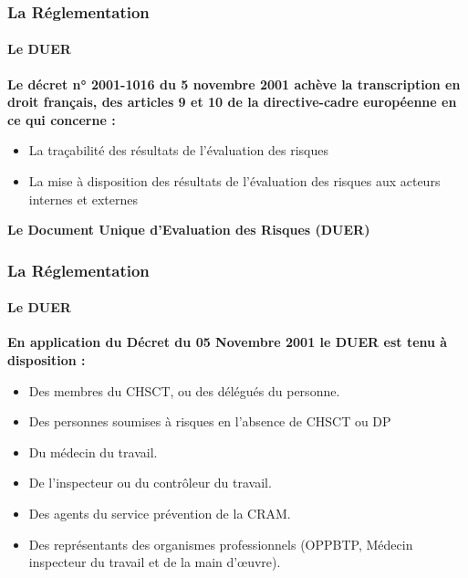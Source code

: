 \documentclass{beamer}
\begin{document}
\begin{frame}
\frametitle{La Réglementation}
\framesubtitle{Le DUER}

\textbf{Le décret n° 2001-1016  du 5 novembre 2001 achève la transcription en droit français, des articles 9 et 10 de 
la directive-cadre européenne en ce qui concerne :}

\begin{itemize}
    \item La traçabilité des résultats de l’évaluation des risques
	\item La mise à disposition des résultats de l’évaluation des risques aux acteurs internes et externes
\end{itemize}

\textbf{Le Document Unique d’Evaluation des Risques (DUER)}
\end{frame}



\begin{frame}
\frametitle{La Réglementation}
\framesubtitle{Le DUER}

\textbf{En application du Décret du 05 Novembre 2001 le DUER est tenu à disposition :}
\begin{itemize}
    \item Des membres du CHSCT, ou des délégués du personne.
	\item Des personnes soumises à risques en l’absence de CHSCT ou DP
	\item Du médecin du travail.
	\item De l’inspecteur ou du contrôleur du travail.
	\item Des agents du service prévention de la CRAM.
	\item Des représentants des organismes professionnels (OPPBTP, Médecin inspecteur du travail et de la main d’œuvre).
\end{itemize}
\end{frame}
\end{document}
